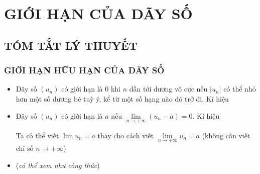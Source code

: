 \section{GIỚI HẠN CỦA DÃY SỐ}
\subsection{TÓM TẮT LÝ THUYẾT}
\subsubsection{GIỚI HẠN HỮU HẠN CỦA DÃY SỐ}
\begin{itemize}
	\item [\iconMT]  Dãy số $(u_n)$ có giới hạn là $0$ khi $n$ dần tới dương vô cực nếu $|u_n|$ có thể nhỏ hơn một số dương bé tuỳ ý, kể từ một số hạng nào đó trở đi.
	Kí hiệu
	\item [\iconMT]   Dãy số $(u_n)$ có giới hạn là $a$ nếu $\lim\limits_{n \to +\infty}(u_n-a)=0$. Kí hiệu
	\begin{luuy}
		Ta có thể viết $\lim u_n=a$ thay cho cách viết $\lim\limits_{n \to +\infty}u_n=a$ (không cần viết chỉ số $n \to +\infty$)
	\end{luuy}
	\item [\iconMT]  (\textit{có thể xem như công thức})
	\begin{gachsoc}
		\begin{itemize}
		\end{itemize}
	\end{gachsoc}
\end{itemize}
